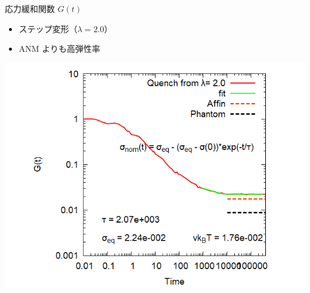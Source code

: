 \documentclass[12pt, dvipdfmx]{beamer}
\begin{document}
\begin{frame}
\begin{columns}[T, onlytextwidth]
			\begin{block}{応力緩和関数 $G(t)$}
				\begin{itemize}
					\item ステップ変形（$\lambda=2.0$）
					\item ANM よりも高弾性率
				\end{itemize}
				\includegraphics[width=\textwidth]{gt_N48_C4_M3.png}
			\end{block}
	\end{columns}
\end{frame}
\end{document}

